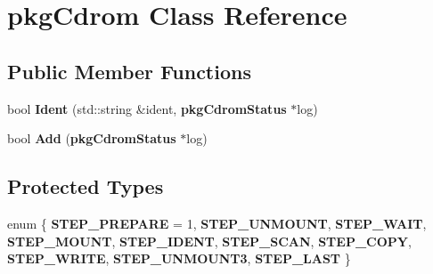 \section{pkg\-Cdrom \-Class \-Reference}
\label{classpkgCdrom}
\subsection*{\-Public \-Member \-Functions}
\begin{DoxyCompactItemize}
\item 
bool {\bfseries \-Ident} (std\-::string \&ident, {\bf pkg\-Cdrom\-Status} $\ast$log)\label{classpkgCdrom_ada44a0ca06ae71f8fb1c21e4d813c14d}

\item 
bool {\bfseries \-Add} ({\bf pkg\-Cdrom\-Status} $\ast$log)\label{classpkgCdrom_a6d1bdb3f763da1f0a388888f206a50a6}

\end{DoxyCompactItemize}
\subsection*{\-Protected \-Types}
\begin{DoxyCompactItemize}
\item 
enum \{ \*
{\bfseries \-S\-T\-E\-P\-\_\-\-P\-R\-E\-P\-A\-R\-E} =  1, 
{\bfseries \-S\-T\-E\-P\-\_\-\-U\-N\-M\-O\-U\-N\-T}, 
{\bfseries \-S\-T\-E\-P\-\_\-\-W\-A\-I\-T}, 
{\bfseries \-S\-T\-E\-P\-\_\-\-M\-O\-U\-N\-T}, 
\*
{\bfseries \-S\-T\-E\-P\-\_\-\-I\-D\-E\-N\-T}, 
{\bfseries \-S\-T\-E\-P\-\_\-\-S\-C\-A\-N}, 
{\bfseries \-S\-T\-E\-P\-\_\-\-C\-O\-P\-Y}, 
{\bfseries \-S\-T\-E\-P\-\_\-\-W\-R\-I\-T\-E}, 
\*
{\bfseries \-S\-T\-E\-P\-\_\-\-U\-N\-M\-O\-U\-N\-T3}, 
{\bfseries \-S\-T\-E\-P\-\_\-\-L\-A\-S\-T}
 \}
\end{DoxyCompactItemize}
